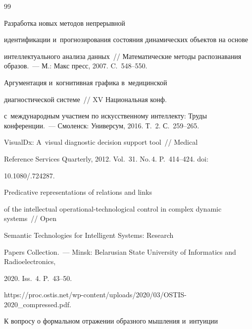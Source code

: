 {\small\frenchspacing

{%


\begin{thebibliography}{99}



\vspace*{-1pt}




 Разработка новых методов непрерывной 

идентификации и~прогнозирования состояния динамических объектов на основе 

интеллектуального анализа данных~/\!\!/ Математические методы распознавания образов.~--- М.: Макс пресс, 2007. C.~548--550.


 Аргументация и~когнитивная графика в~медицинской 

диагностической системе~/\!\!/ XV Национальная конф.\

с~международным участием по искусственному интеллекту: Труды конференции.~--- Смоленск: Универсум, 2016. Т.~2. С.~259--265.


 VisualDx: A~visual diagnostic decision support tool~/\!\!/ Medical 

Reference Services Quarterly, 2012. Vol.~31. No.\,4. P.~414--424. doi: 

10.1080\!/.724287.


 Predicative representations of relations and links 

of the intellectual operational-technological control in complex dynamic systems~/\!\!/ Open 

Semantic Technologies for Intelligent Systems: Research 

Papers Collection.~--- Minsk: Belarusian State University of Informatics and Radioelectronics, 

2020. Iss.~4. P.~43--50. 

{\sf https://proc.ostis.net/wp-content/uploads/2020/03/OSTIS-2020\_compressed.pdf}.


 К вопросу о формальном отражении образного мышления и~интуиции 


\end{thebibliography}}}
